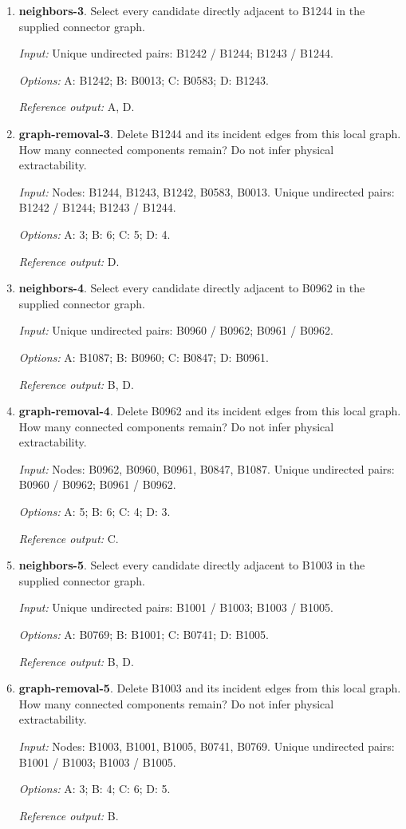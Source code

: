 \begin{enumerate}
\item \textbf{neighbors-3}. Select every candidate directly adjacent to B1244 in the supplied connector graph.\par {\small \textit{Input:} Unique undirected pairs: B1242 / B1244; B1243 / B1244. \par\textit{Options:} A: B1242; B: B0013; C: B0583; D: B1243. \par\textit{Reference output:} A, D.}
\item \textbf{graph-removal-3}. Delete B1244 and its incident edges from this local graph. How many connected components remain? Do not infer physical extractability.\par {\small \textit{Input:} Nodes: B1244, B1243, B1242, B0583, B0013. Unique undirected pairs: B1242 / B1244; B1243 / B1244. \par\textit{Options:} A: 3; B: 6; C: 5; D: 4. \par\textit{Reference output:} D.}
\item \textbf{neighbors-4}. Select every candidate directly adjacent to B0962 in the supplied connector graph.\par {\small \textit{Input:} Unique undirected pairs: B0960 / B0962; B0961 / B0962. \par\textit{Options:} A: B1087; B: B0960; C: B0847; D: B0961. \par\textit{Reference output:} B, D.}
\item \textbf{graph-removal-4}. Delete B0962 and its incident edges from this local graph. How many connected components remain? Do not infer physical extractability.\par {\small \textit{Input:} Nodes: B0962, B0960, B0961, B0847, B1087. Unique undirected pairs: B0960 / B0962; B0961 / B0962. \par\textit{Options:} A: 5; B: 6; C: 4; D: 3. \par\textit{Reference output:} C.}
\item \textbf{neighbors-5}. Select every candidate directly adjacent to B1003 in the supplied connector graph.\par {\small \textit{Input:} Unique undirected pairs: B1001 / B1003; B1003 / B1005. \par\textit{Options:} A: B0769; B: B1001; C: B0741; D: B1005. \par\textit{Reference output:} B, D.}
\item \textbf{graph-removal-5}. Delete B1003 and its incident edges from this local graph. How many connected components remain? Do not infer physical extractability.\par {\small \textit{Input:} Nodes: B1003, B1001, B1005, B0741, B0769. Unique undirected pairs: B1001 / B1003; B1003 / B1005. \par\textit{Options:} A: 3; B: 4; C: 6; D: 5. \par\textit{Reference output:} B.}

\end{enumerate}
